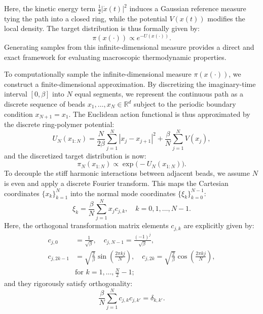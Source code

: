 \documentclass[%
 reprint,
 amsmath,amssymb,
 aps,
 pre,
]{revtex4-2}
\begin{document}
Here, the kinetic energy term $\frac{1}{2} |\dot{x}(t)|^2$ induces a Gaussian reference measure tying the path into a closed ring, while the potential $V(x(t))$ modifies the local density. The target distribution is thus formally given by:
\begin{equation*}
    \pi(x(\cdot)) \propto e^{-U(x(\cdot))}.
\end{equation*}
Generating samples from this infinite-dimensional measure provides a direct and exact framework for evaluating macroscopic thermodynamic properties.

To computationally sample the infinite-dimensional measure $\pi(x(\cdot))$, we construct a finite-dimensional approximation. By discretizing the imaginary-time interval $[0, \beta]$ into $N$ equal segments, we represent the continuous path as a discrete sequence of beads $x_1, \dots, x_N \in \mathbb{R}^d$ subject to the periodic boundary condition $x_{N+1} = x_1$. The Euclidean action functional is thus approximated by the discrete ring-polymer potential:
\begin{equation}
    U_N(x_{1:N}) = \frac{N}{2\beta} \sum_{j=1}^N |x_j - x_{j+1}|^2 + \frac{\beta}{N} \sum_{j=1}^N V(x_j),
    \label{eq: UNx}
\end{equation}
and the discretized target distribution is now:
\begin{equation*}
	\pi_N(x_{1:N})\propto \exp\big(-U_N(x_{1:N})\big).
\end{equation*}
To decouple the stiff harmonic interactions between adjacent beads, we assume $N$ is even and apply a discrete Fourier transform. This maps the Cartesian coordinates $\{x_k\}_{k=1}^N$ into the normal mode coordinates $\{\xi_k\}_{k=0}^{N-1}$:
\begin{equation}
    \xi_k = \frac{\beta}{N} \sum_{j=1}^N x_j c_{j,k}, \quad k = 0, 1, \dots, N-1.
\end{equation}
Here, the orthogonal transformation matrix elements $c_{j,k}$ are explicitly given by:
\begin{align*}
    c_{j,0} &= \frac{1}{\sqrt{\beta}}, \quad c_{j,N-1} = \frac{(-1)^j}{\sqrt{\beta}}, \\
    c_{j,2k-1} &= \sqrt{\frac{2}{\beta}} \sin\left(\frac{2\pi k j}{N}\right), \quad
    c_{j,2k} = \sqrt{\frac{2}{\beta}} \cos\left(\frac{2\pi k j}{N}\right), \\
    & \text{for } k = 1, \dots, \frac{N}{2} - 1;
\end{align*}
and they rigorously satisfy orthogonality:
\begin{equation*}
    \frac{\beta}{N} \sum_{j=1}^N c_{j,k} c_{j,k'} = \delta_{k,k'}.
\end{equation*}
\end{document}
